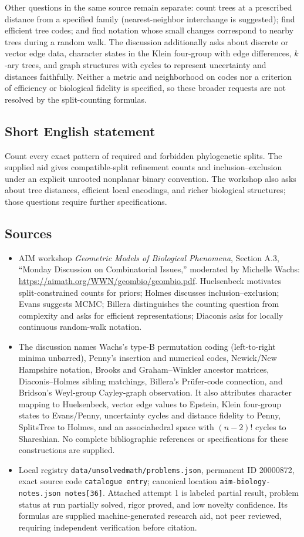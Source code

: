 \documentclass[11pt]{article}
\begin{document}
Other questions in the same source remain separate: count trees at a prescribed distance from a specified family (nearest-neighbor interchange is suggested); find efficient tree codes; and find notation whose small changes correspond to nearby trees during a random walk. The discussion additionally asks about discrete or vector edge data, character states in the Klein four-group with edge differences, $k$-ary trees, and graph structures with cycles to represent uncertainty and distances faithfully. Neither a metric and neighborhood on codes nor a criterion of efficiency or biological fidelity is specified, so these broader requests are not resolved by the split-counting formulas.
\subsection{Short English statement}
Count every exact pattern of required and forbidden phylogenetic splits. The supplied aid gives compatible-split refinement counts and inclusion--exclusion under an explicit unrooted nonplanar binary convention. The workshop also asks about tree distances, efficient local encodings, and richer biological structures; those questions require further specifications.
\subsection{Sources}
\begin{itemize}
\item AIM workshop \emph{Geometric Models of Biological Phenomena}, Section A.3, ``Monday Discussion on Combinatorial Issues,'' moderated by Michelle Wachs: \url{https://aimath.org/WWN/geombio/geombio.pdf}. Huelsenbeck motivates split-constrained counts for priors; Holmes discusses inclusion--exclusion; Evans suggests MCMC; Billera distinguishes the counting question from complexity and asks for efficient representations; Diaconis asks for locally continuous random-walk notation.
\item The discussion names Wachs's type-B permutation coding (left-to-right minima unbarred), Penny's insertion and numerical codes, Newick/New Hampshire notation, Brooks and Graham--Winkler ancestor matrices, Diaconis--Holmes sibling matchings, Billera's Pr\"ufer-code connection, and Bridson's Weyl-group Cayley-graph observation. It also attributes character mapping to Huelsenbeck, vector edge values to Epstein, Klein four-group states to Evans/Penny, uncertainty cycles and distance fidelity to Penny, SplitsTree to Holmes, and an associahedral space with $(n-2)!$ cycles to Shareshian. No complete bibliographic references or specifications for these constructions are supplied.
\item Local registry \texttt{data/unsolvedmath/problems.json}, permanent ID 20000872, exact source code \texttt{catalogue entry}; canonical location \texttt{aim-biology-notes.json notes[36]}. Attached attempt 1 is labeled partial result, problem status at run partially solved, rigor proved, and low novelty confidence. Its formulas are supplied machine-generated research aid, not peer reviewed, requiring independent verification before citation.
\end{itemize}
\end{document}
